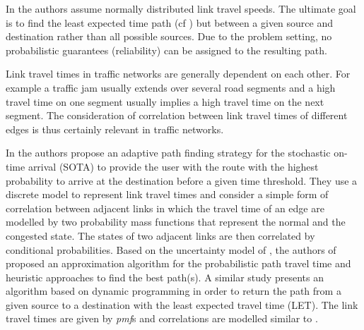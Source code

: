 In \cite{Bi-Yu13} the authors assume normally distributed link travel speeds. The ultimate goal is to find the least expected time path (cf \cite{Miller-Hooks00}) but between a given source and destination rather than all possible sources. Due to the problem setting, no probabilistic guarantees (reliability) can be assigned to the resulting path.



Link travel times in traffic networks are generally dependent on each other. For example a traffic jam usually extends over several road segments and a high travel time on one segment usually implies a high travel time on the next segment. The consideration of correlation between link travel times of different edges is thus certainly relevant in traffic networks.

In \cite{Nie06} the authors propose an adaptive path finding strategy for the stochastic on-time arrival (SOTA) to provide the user with the route with the highest probability to arrive at the destination before a given time threshold. They use a discrete model to represent link travel times and consider a simple form of correlation between adjacent links in which the travel time of an edge are modelled by two probability mass functions that represent the normal and the congested state. The states of two adjacent links are then correlated by conditional probabilities.  Based on the uncertainty model of \cite{Nie06}, the authors of \cite{Hua10} proposed an approximation algorithm for the probabilistic path travel time and heuristic approaches to find the best path(s). A similar study \cite{Fan05} presents an algorithm based on dynamic programming in order to return the path from a given source to a destination with the least expected travel time (LET). The link travel times are given by \textit{pmf}s and correlations are modelled similar to \cite{Nie06}.

